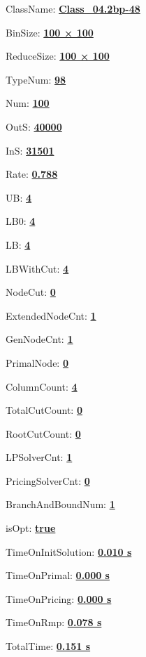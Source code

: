 \documentclass[11pt]{article}
\begin{document}
\pagestyle{empty}


ClassName: \underline{\textbf{Class_04.2bp-48}}
\par
BinSize: \underline{\textbf{100 × 100}}
\par
ReduceSize: \underline{\textbf{100 × 100}}
\par
TypeNum: \underline{\textbf{98}}
\par
Num: \underline{\textbf{100}}
\par
OutS: \underline{\textbf{40000}}
\par
InS: \underline{\textbf{31501}}
\par
Rate: \underline{\textbf{0.788}}
\par
UB: \underline{\textbf{4}}
\par
LB0: \underline{\textbf{4}}
\par
LB: \underline{\textbf{4}}
\par
LBWithCut: \underline{\textbf{4}}
\par
NodeCut: \underline{\textbf{0}}
\par
ExtendedNodeCnt: \underline{\textbf{1}}
\par
GenNodeCnt: \underline{\textbf{1}}
\par
PrimalNode: \underline{\textbf{0}}
\par
ColumnCount: \underline{\textbf{4}}
\par
TotalCutCount: \underline{\textbf{0}}
\par
RootCutCount: \underline{\textbf{0}}
\par
LPSolverCnt: \underline{\textbf{1}}
\par
PricingSolverCnt: \underline{\textbf{0}}
\par
BranchAndBoundNum: \underline{\textbf{1}}
\par
isOpt: \underline{\textbf{true}}
\par
TimeOnInitSolution: \underline{\textbf{0.010 s}}
\par
TimeOnPrimal: \underline{\textbf{0.000 s}}
\par
TimeOnPricing: \underline{\textbf{0.000 s}}
\par
TimeOnRmp: \underline{\textbf{0.078 s}}
\par
TotalTime: \underline{\textbf{0.151 s}}
\par
\newpage
\end{document}
